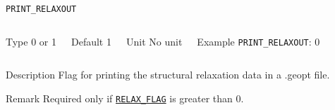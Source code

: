 \begin{frame}[allowframebreaks]{\texttt{PRINT\_RELAXOUT}} \label{PRINT_RELAXOUT}
\vspace*{-12pt}
\begin{columns}
\begin{block}{Type}
0 or 1
\end{block}

\begin{block}{Default}
1
\end{block}

\begin{block}{Unit}
No unit
\end{block}

\begin{block}{Example}
\texttt{PRINT\_RELAXOUT}: 0
\end{block}
\end{columns}

\begin{block}{Description}
Flag for printing the structural relaxation data in a .geopt file.
\end{block}

\begin{block}{Remark}
Required only if \hyperlink{RELAX_FLAG}{\texttt{RELAX\_FLAG}} is greater than $0$.
\end{block}

\end{frame}



